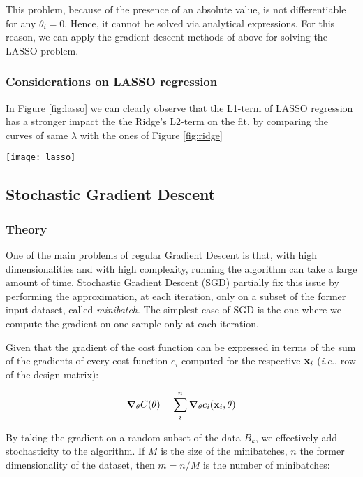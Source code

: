 \documentclass[11pt,a4paper,twocolumn]{article}
\begin{document}
This problem, because of the presence of an absolute value, is not differentiable for any $\theta_i = 0$. Hence, it cannot be solved via analytical expressions. For this reason, we can apply the gradient descent methods of above for solving the LASSO problem. 

\subsubsection{Considerations on LASSO regression}
In Figure \ref{fig:lasso} we can clearly observe that the L1-term of LASSO regression has a stronger impact the the Ridge's L2-term on the fit, by comparing the curves of same $\lambda$ with the ones of Figure \ref{fig:ridge}

\begin{figure*}
	\centering
	\texttt{[image: lasso]}
	\caption{\textbf{Lasso regression} | With a Gradient Descent, 100000 iterations and $\eta = 10^{-4}$}
	\label{fig:lasso}
\end{figure*}

\subsection{Stochastic Gradient Descent}

\subsubsection{Theory}
One of the main problems of regular Gradient Descent is that, with high dimensionalities and with high complexity, running the algorithm can take a large amount of time. Stochastic Gradient Descent (SGD) partially fix this issue by performing the approximation, at each iteration, only on a subset of the former input dataset, called \emph{minibatch}. The simplest case of SGD is the one where we compute the gradient on one sample only at each iteration.

Given that the gradient of the cost function can be expressed in terms of the sum of the gradients of every cost function $c_i$ computed for the respective $\bold{x}_i$ (\emph{i.e.}, row of the design matrix):

\begin{equation}
	\grad_\theta C(\mathbf{\theta}) = \sum_i^n \grad_\theta c_i(\mathbf{x}_i,
	\mathbf{\theta})
\end{equation}

By taking the gradient on a random subset of the data $B_k$, we effectively add stochasticity to the algorithm. If $M$ is the size of the minibatches, $n$ the former dimensionality of the dataset, then $m = n/M$ is the number of minibatches:
\end{document}
